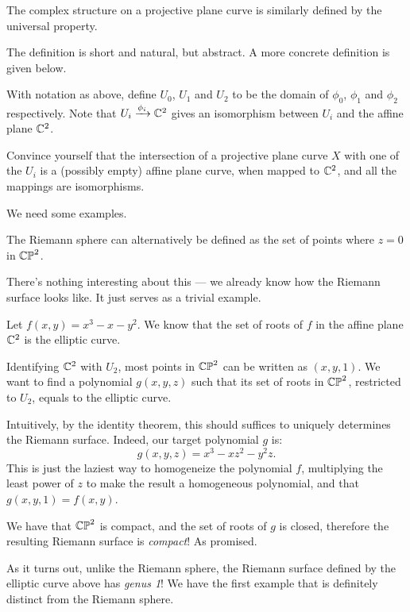 The complex structure on a projective plane curve is similarly defined by the universal property.

The definition is short and natural, but abstract. A more concrete definition is given below.
\begin{ques}
	With notation as above, define $U_0$, $U_1$ and $U_2$ to be the domain of $\phi_0$, $\phi_1$ and
	$\phi_2$ respectively.
	Note that $U_i \xrightarrow{\phi_i} \mathbb C^2$ gives an isomorphism between $U_i$ and the affine plane
	$\mathbb C^2$.

	Convince yourself that the intersection of a projective plane curve $X$ with one of the $U_i$ is
	a (possibly empty) affine plane curve, when mapped to $\mathbb C^2$, and all the mappings are
	isomorphisms.
\end{ques}

We need some examples.

\begin{example}
	The Riemann sphere can alternatively be defined as the set of points where $z = 0$ in $\mathbb{CP}^2$.

	There's nothing interesting about this --- we already know how the Riemann surface looks like.
	It just serves as a trivial example.
\end{example}

\begin{example}
	Let $f(x, y) = x^3-x-y^2$. We know that the set of roots of $f$ in the affine plane $\mathbb C^2$ is
	the elliptic curve.

	Identifying $\mathbb C^2$ with $U_2$, most points in $\mathbb{CP}^2$ can be written as $(x, y, 1)$.
	We want to find a polynomial $g(x, y, z)$ such that its set of roots in $\mathbb{CP}^2$, restricted to
	$U_2$, equals to the elliptic curve.

	Intuitively, by the identity theorem, this should suffices to uniquely determines the Riemann
	surface. Indeed, our target polynomial $g$ is:
	\[ g(x, y, z) = x^3-xz^2-y^2 z.  \]
	This is just the laziest way to homogeneize the polynomial $f$, multiplying the least power of
	$z$ to make the result a homogeneous polynomial, and that $g(x, y, 1) = f(x, y)$.

	We have that $\mathbb{CP}^2$ is compact, and the set of roots of $g$ is closed, therefore the resulting
	Riemann surface is \emph{compact}! As promised.
\end{example}

As it turns out, unlike the Riemann sphere, the Riemann surface defined by the elliptic curve above
has \emph{genus 1}! We have the first example that is definitely distinct from
the Riemann sphere.

